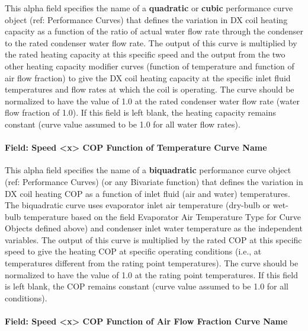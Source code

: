 This alpha field specifies the name of a \textbf{quadratic} or \textbf{cubic} performance curve object (ref: Performance Curves) that defines the variation in DX coil heating capacity as a function of the ratio of actual water flow rate through the condenser to the rated condenser water flow rate.
The output of this curve is multiplied by the rated heating capacity at this specific speed and the output from the two other heating capacity modifier curves (function of temperature and function of air flow fraction) to give the DX coil heating capacity at the specific inlet fluid temperatures and flow rates at which the coil is operating. The curve should be normalized to have the value of 1.0 at the rated condenser water flow rate (water flow fraction of 1.0). If this field is left blank, the heating capacity remains constant (curve value assumed to be 1.0 for all water flow rates).


\paragraph{Field: Speed \textless{}x\textgreater{} COP Function of Temperature Curve Name}\label{vshpwhheating-speed-x-cop-function-of-temperature-curve-name}

This alpha field specifies the name of a \textbf{biquadratic} performance curve object (ref: Performance Curves) (or any Bivariate function) that defines the variation in DX coil heating COP as a function of inlet fluid (air and water) temperatures.
The biquadratic curve uses evaporator inlet air temperature (dry-bulb or wet-bulb temperature based on the field Evaporator Air Temperature Type for Curve Objects defined above) and condenser inlet water temperature as the independent variables.
The output of this curve is multiplied by the rated COP at this specific speed to give the heating COP at specific operating conditions (i.e., at temperatures different from the rating point temperatures). The curve should be normalized to have the value of 1.0 at the rating point temperatures. If this field is left blank, the COP remains constant (curve value assumed to be 1.0 for all conditions).


\paragraph{Field: Speed \textless{}x\textgreater{} COP Function of Air Flow Fraction Curve Name}\label{vshpwhheating-speed-x-cop-function-of-air-flow-fraction-curve-name}

